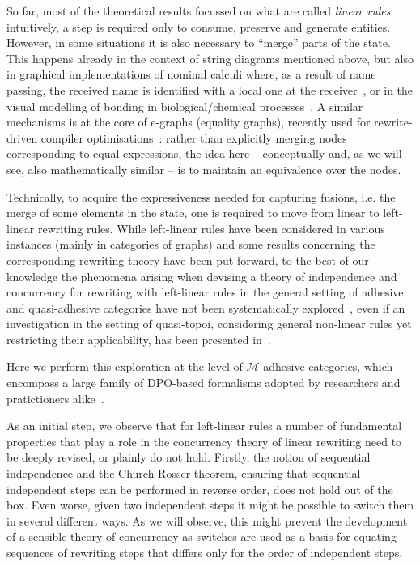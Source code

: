 \documentclass[a4paper,UKenglish,cleveref,pdftex,thm-restate,numberwithinsect,anonymous]{lipics}
\begin{document}
So far, most of the theoretical results focussed on what are called
\emph{linear rules}: intuitively, a step is required only to consume,
preserve and generate entities.  However, in some situations it is
also necessary to ``merge'' parts of the state.  This happens already
in the context of string diagrams mentioned above, but also in
graphical implementations of nominal calculi where, as a result of
name passing, the received name is identified with a local one at the
receiver~\cite{CVY:ESSPE,Gad07}, or in the visual modelling of bonding
in biological/chemical processes~\cite{PUY:MBPE}. A similar mechanisms
is at the core of e-graphs (equality graphs), recently used for
rewrite-driven compiler optimisations~\cite{WNW:egg}: rather than
explicitly merging nodes corresponding to equal expressions, the idea
here -- conceptually and, as we will see, also mathematically similar
-- is to maintain an
equivalence %
over the nodes.



Technically, to acquire the expressiveness needed for capturing
fusions, i.e. the merge of some elements in the state, one is required to
move from linear to left-linear rewriting rules. While left-linear
rules have been considered in various instances (mainly in categories
of graphs) and some results concerning the corresponding rewriting
theory have been put forward, to the best of our knowledge the
phenomena arising when devising a theory of independence and
concurrency for rewriting with left-linear rules in the general
setting of adhesive and quasi-adhesive categories
have not been systematically
explored~\cite{Ehrig1976,EHP:BRfTToHLRS,baldan2011adhesivity},
even if an investigation in the setting of quasi-topoi, considering general
non-linear rules yet restricting their applicability,
has been presented in~\cite{BehrHK23}.

Here we perform this exploration at the level of $\mathcal{M}$-adhesive categories, 
which encompass a large family of DPO-based formalisms adopted by researchers and 
pratictioners alike~\cite{xxx}. 

As an initial step, %
we observe that for
left-linear rules a number of fundamental properties that play a role
in the concurrency theory of linear rewriting need to be deeply revised, or
plainly do not hold.
%
Firstly, the notion of sequential independence and the Church-Rosser
theorem, ensuring that sequential independent steps can be performed
in reverse order, does not hold out of the box. Even worse, given two
independent steps it might be possible to switch them in several
different ways. As we will observe, this might prevent the development
of a sensible theory of concurrency as switches are used as a basis
for equating sequences of rewriting steps that differs only for the order of independent
steps.
\end{document}
